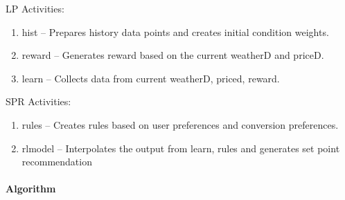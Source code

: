 LP Activities:

\begin{enumerate}
\item hist – Prepares history data points and creates initial condition weights.
\item reward – Generates reward based on the current weatherD and priceD.
\item learn – Collects data from current weatherD, priced, reward.
\end{enumerate}

SPR Activities:

\begin{enumerate}
\item rules – Creates rules based on user preferences and conversion preferences.
\item rlmodel – Interpolates the output from learn, rules and generates set point recommendation
\end{enumerate}

\paragraph*{Algorithm}



